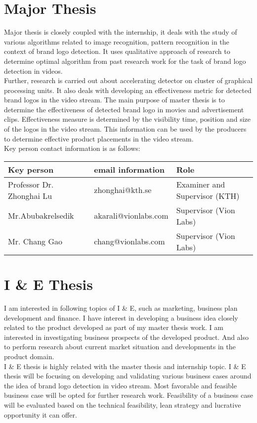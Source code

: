 \section{Major Thesis}
  Major thesis is closely coupled with the internship, it deals with the study of various algorithms related to image recognition, pattern recognition in the context of brand logo detection. It uses qualitative approach of research to determine optimal algorithm from past research work for the task of brand logo detection in videos. \\
  Further, research is carried out about accelerating detector on cluster of graphical processing units. It also deals with developing an effectiveness metric for detected brand logos in the video stream. The main purpose of master thesis is to determine the effectiveness of detected brand logo in movies and advertisement clips. Effectiveness measure is determined by the visibility time, position and size of the logos in the video stream. This information can be used by the producers to determine effective product placements in the video stream.\\
  Key person contact information is as follows:
  \begin{table}[h]
    \begin{tabular}{|l|l|l|}
    \hline
    Key person & email information & Role \\ \hline
    Professor Dr. Zhonghai Lu & zhonghai@kth.se & Examiner and Supervisor (KTH)\\ \hline
    Mr.Abubakrelsedik & akarali@vionlabs.com &  Supervisor (Vion Labs)\\ \hline
    Mr. Chang Gao & chang@vionlabs.com &  Supervisor (Vion Labs)\\ \hline
    \end{tabular}
  \end{table}
  
\section{I \& E Thesis}
  I am interested in following topics of I \& E, such as marketing, business plan development and finance. I have interest in developing a business idea closely related to the product developed as part of my master thesis work. I am interested in investigating business prospects of the developed product. And also to perform research about current market situation and developments in the product domain.\\
  I \& E thesis is highly related with the master thesis and internship topic. I \& E thesis will be focusing on developing and validating various business cases around the idea of brand logo detection in video stream. Most favorable and feasible business case will be opted for further research work. Feasibility of a business case will be evaluated based on the technical feasibility, lean strategy and lucrative opportunity it can offer.                   
  
